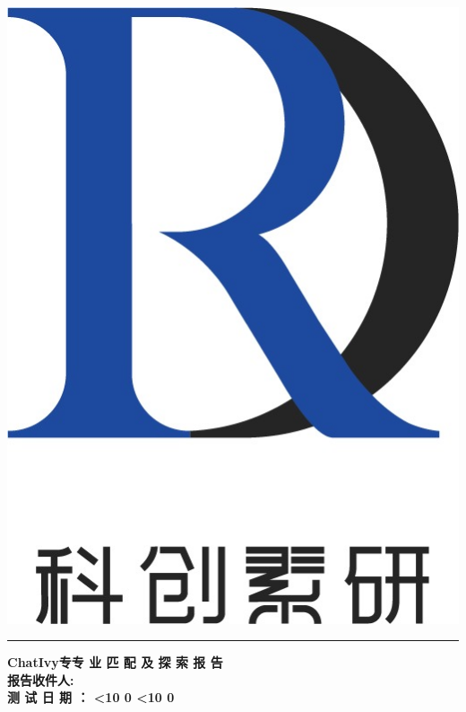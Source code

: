 \documentclass[12pt]{article}
\newcommand{\insertname}{
}
\newcommand{\customdate}{
    \the\year年\hspace{0.5em}%
    \ifnum\month<10 0\fi\the\month月\hspace{0.5em}%
    \ifnum\day<10 0\fi\the\day日%
}
\begin{document}
\thispagestyle{empty} 
\begin{CJK*}{UTF8}{gbsn}

\noindent\hfill\begin{minipage}{2.0cm} %
   \includegraphics[width=\textwidth]{logo.jpg}
\end{minipage}
\vspace{-3.7cm}

\noindent\textcolor{darkblue}{\rule{\textwidth}{5pt}} %

\vspace{10pt} %
{\noindent\Large\bfseries\hspace*{0.5cm}ChatIvy专专 业 匹 配 及 探 索 报 告}\\[12pt] %
{\noindent\large\bfseries\hspace*{0.5cm}报告收件人: \insertname}\\[10pt] %
{\noindent\large\bfseries\hspace*{0.5cm}测 试 日 期 ：\customdate}
\vspace{10pt} %


\end{CJK*}
\end{document}
